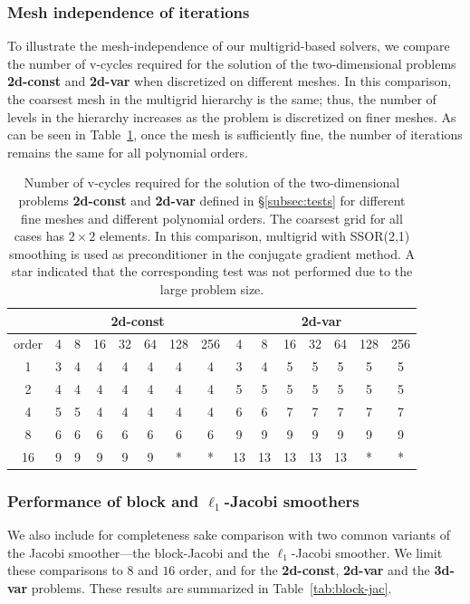 \documentclass[times]{nlaauth}
\begin{document}
\subsubsection{Mesh independence of iterations}\label{subsec:num_mesh}
To illustrate the mesh-independence of our multigrid-based solvers, we
compare the number of v-cycles required for the solution of the
two-dimensional problems {\bf 2d-const} and {\bf 2d-var} when
discretized on different meshes. In this comparison, the coarsest mesh
in the multigrid hierarchy is the same; thus, the number of levels in the
hierarchy increases as the problem is discretized on finer meshes. As
can be seen in Table~\ref{tab:meshInd}, once the mesh is sufficiently
fine, the number of iterations remains the same  for all polynomial orders.
\begin{table}[h]\centering
\caption{\label{tab:meshInd} Number of v-cycles required for the
  solution of the two-dimensional problems {\bf 2d-const} and {\bf
    2d-var} defined in \S\ref{subsec:tests} for different fine
  meshes and different polynomial orders. The coarsest grid for all
  cases has $2\times 2$ elements. In this comparison, multigrid with
  SSOR(2,1) smoothing is used as preconditioner in the conjugate
  gradient method. A star indicated that the
  corresponding test was not performed due to the large problem size.}
\begin{tabular}{|c|c|c|c|c|c|c|c||c|c|c|c|c|c|c|}
	\hline
	 & \multicolumn{7}{c||}{\bf 2d-const} &
        \multicolumn{7}{c|}{\bf 2d-var} \\  
  \hline
	order & 4  &  8 & 16 & 32 & 64 & 128 & 256 & 4  &  8 & 16 & 32 & 64 & 128 & 256 \\
	\hline 
	 1    &  3 &  4 &  4 &  4 &  4 &  4  &  4  & 3  &  4 & 5  &  5 &  5 &  5  &  5  \\
	 2    &  4 &  4 &  4 &  4 &  4 &  4  &  4  & 5  &  5 & 5  &  5 &  5 &  5  &  5  \\
	 4    &  5 &  5 &  4 &  4 &  4 &  4  &  4  & 6  &  6 & 7  &  7 &  7 &  7  &  7  \\
	 8    &  6 &  6 &  6 &  6 &  6 &  6  &  6  & 9  &  9 & 9  &  9 &  9 &  9  &  9  \\
	 16   &  9 &  9 &  9 &  9 &  9 &  *  &  *  & 13 & 13 & 13 & 13 & 13 &  *  &  *  \\
	 \hline
\end{tabular}

\end{table}

\subsubsection{Performance of block and $\ell_1$-Jacobi smoothers}\label{subsec:num_block}
We also include for completeness sake comparison with two common 
variants of the Jacobi smoother---the block-Jacobi and the $\ell_1$-Jacobi smoother.
We limit these comparisons to $8$ and $16$ order, and for the {\bf 2d-const}, {\bf
2d-var} and the {\bf 3d-var} problems. These results are summarized in Table~\ref{tab:block-jac}.
\end{document}
